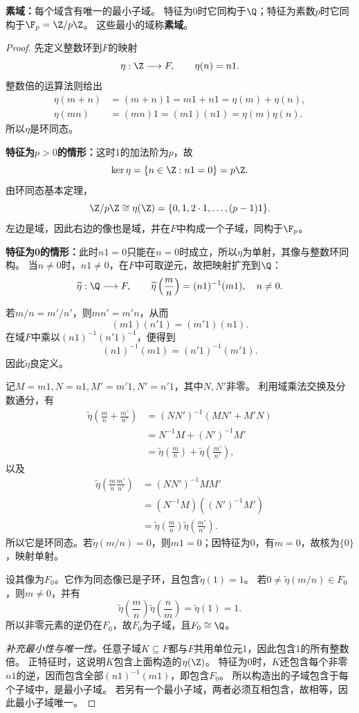 \begin{theorem}
\label{p2:concept:c1-l1517}\textbf{素域：}每个域含有唯一的最小子域。
特征为0时它同构于$\Q$；特征为素数$p$时它同构于$\F_p=\Z/p\Z$。
这些最小的域称\textbf{素域}。
\end{theorem}
\begin{proof}
先定义整数环到$F$的映射
\[
\eta:\Z\longrightarrow F,\qquad \eta(n)=n1.
\]
整数倍的运算法则给出
\[
\begin{aligned}
\eta(m+n)&=(m+n)1=m1+n1=\eta(m)+\eta(n),\\
\eta(mn)&=(mn)1=(m1)(n1)=\eta(m)\eta(n).
\end{aligned}
\]
所以$\eta$是环同态。

\textbf{特征为$p>0$的情形：}这时1的加法阶为$p$，故
\[
\ker\eta=\{n\in\Z:n1=0\}=p\Z.
\]
由环同态基本定理，
\[
\Z/p\Z\cong\eta(\Z)=\{0,1,2\cdot1,\ldots,(p-1)1\}.
\]
左边是域，因此右边的像也是域，并在$F$中构成一个子域，同构于$\F_p$。

\textbf{特征为0的情形：}此时$n1=0$只能在$n=0$时成立，所以$\eta$为单射，其像与整数环同构。
当$n\neq0$时，$n1\neq0$，在$F$中可取逆元，故把映射扩充到$\Q$：
\[
\widetilde\eta:\Q\longrightarrow F,\qquad
\widetilde\eta\left(\frac mn\right)=(n1)^{-1}(m1),\quad n\neq0.
\]

若$m/n=m'/n'$，则$mn'=m'n$，从而
\[
(m1)(n'1)=(m'1)(n1).
\]
在域$F$中乘以$(n1)^{-1}(n'1)^{-1}$，便得到
\[
(n1)^{-1}(m1)=(n'1)^{-1}(m'1).
\]
因此$\widetilde\eta$良定义。

记$M=m1,N=n1,M'=m'1,N'=n'1$，其中$N,N'$非零。
利用域乘法交换及分数通分，有
\[
\begin{aligned}
\widetilde\eta\left(\frac mn+\frac{m'}{n'}\right)
&=(NN')^{-1}(MN'+M'N)\\
&=N^{-1}M+(N')^{-1}M'\\
&=\widetilde\eta\left(\frac mn\right)
+\widetilde\eta\left(\frac{m'}{n'}\right),
\end{aligned}
\]
以及
\[
\begin{aligned}
\widetilde\eta\left(\frac mn\frac{m'}{n'}\right)
&=(NN')^{-1}MM'\\
&=(N^{-1}M)((N')^{-1}M')\\
&=\widetilde\eta\left(\frac mn\right)
\widetilde\eta\left(\frac{m'}{n'}\right).
\end{aligned}
\]
所以它是环同态。若$\widetilde\eta(m/n)=0$，则$m1=0$；因特征为0，有$m=0$，故核为$\{0\}$，映射单射。

设其像为$F_0$。它作为同态像已是子环，且包含$\widetilde\eta(1)=1$。
若$0\neq\widetilde\eta(m/n)\in F_0$，则$m\neq0$，并有
\[
\widetilde\eta\left(\frac mn\right)
\widetilde\eta\left(\frac nm\right)
=\widetilde\eta(1)=1.
\]
所以非零元素的逆仍在$F_0$，故$F_0$为子域，且$F_0\cong\Q$。

\textit{补充最小性与唯一性。}任意子域$K\subseteq F$都与$F$共用单位元1，因此包含1的所有整数倍。
正特征时，这说明$K$包含上面构造的$\eta(\Z)$。
特征为0时，$K$还包含每个非零$n1$的逆，因而包含全部$(n1)^{-1}(m1)$，即包含$F_0$。
所以构造出的子域包含于每个子域中，是最小子域。
若另有一个最小子域，两者必须互相包含，故相等，因此最小子域唯一。
\end{proof}



